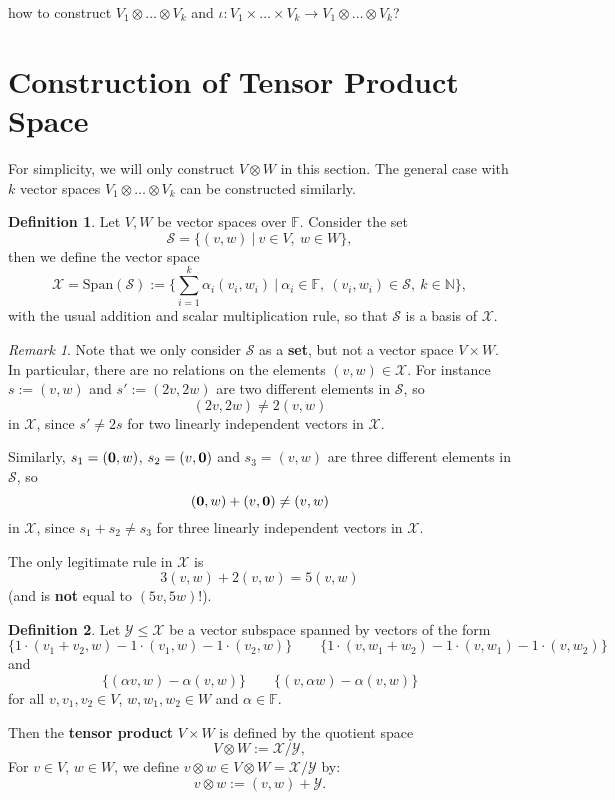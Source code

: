 \documentclass[11pt,openany]{book}
\theoremstyle{plain}
\theoremstyle{definition}
\newtheorem{definition}[definition]{Definition}
\theoremstyle{remark}
\newtheorem{remark}[remark]{Remark}
\begin{document}
\medskip
{} how to construct $V_1 \otimes \dots \otimes V_k$ and  $\iota: V_1 \times \dots \times V_k \to V_1 \otimes \dots \otimes V_k$?


\section{Construction of Tensor Product Space} 
For simplicity, we will only construct $V \otimes W$ in this section. The general case with $k$ vector spaces $V_1 \otimes \dots \otimes V_k$ can be constructed similarly.

\begin{definition} 
Let $V,W$ be vector spaces over $\mathbb{F}$. Consider the set
$$\mathcal{S} = \{(v,w)\ |\ v \in V,\ w \in W\},$$
then we define the vector space
$$\mathcal{X} = \mathrm{Span}(\mathcal{S}) := \{\sum_{i=1}^k \alpha_i(v_i,w_i)\ |\ \alpha_i \in \mathbb{F},\ (v_i,w_i) \in \mathcal{S},\ k \in \mathbb{N}\},$$ with the usual addition and scalar multiplication rule, so that $\mathcal{S}$ is a basis of $\mathcal{X}$.
\end{definition}

\begin{remark}
Note that we only consider $\mathcal{S}$ as a {\bf set}, but not a vector space $V \times W$. In particular, there are no relations on the elements $(v,w) \in \mathcal{X}$. For instance $s := (v,w)$ and $s' := (2v, 2w)$ are two different elements in $\mathcal{S}$, so
    $$(2v, 2w) \neq 2(v,w)$$
in $\mathcal{X}$, since $s' \neq 2s$ for two linearly independent vectors in $\mathcal{X}$.

Similarly, $s_1 = ({\bf 0}, w)$, $s_2 = (v,{\bf 0})$ and $s_3 = (v,w)$ are three different elements in $\mathcal{S}$, so
    $$({\bf 0}, w) + (v,{\bf 0}) \neq (v,w)$$
in $\mathcal{X}$, since $s_1 + s_2 \neq s_3$ for three linearly independent vectors in $\mathcal{X}$.  

The only legitimate rule in $\mathcal{X}$ is
    $$3(v,w) + 2(v,w) = 5(v,w)$$
    (and is {\bf not} equal to $(5v,5w)$!).
\end{remark}


\begin{definition} Let $\mathcal{Y} \leq \mathcal{X}$ be a vector subspace spanned by vectors of the form
$$\{1\cdot (v_1+v_2,w) - 1\cdot (v_1,w) - 1\cdot (v_2,w)\}\quad \quad \{1\cdot (v,w_1 + w_2) - 1\cdot (v,w_1) - 1\cdot (v,w_2)\}$$
and
$$\{(\alpha v,w) - \alpha (v,w)\} \quad \quad \{(v, \alpha w) - \alpha(v,w) \}$$
for all $v,v_1,v_2 \in V$, $w, w_1, w_2 \in W$ and $\alpha \in \mathbb{F}$. 

Then the {\bf tensor product} $V \times W$ is defined by 
the quotient space
$$V \otimes W := \mathcal{X}/\mathcal{Y},$$
For $v \in V$, $w \in W$, we define $v \otimes w \in V \otimes W = \mathcal{X}/\mathcal{Y}$ by:
$$v \otimes w := (v,w) + \mathcal{Y}.$$
\end{definition}
\end{document}
